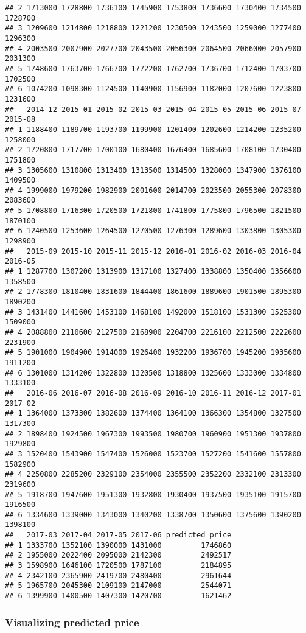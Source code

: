 \documentclass[
]{article}
\begin{document}
\begin{verbatim}
## 2 1713000 1728800 1736100 1745900 1753800 1736600 1730400 1734500 1728700
## 3 1209600 1214800 1218800 1221200 1230500 1243500 1259000 1277400 1296300
## 4 2003500 2007900 2027700 2043500 2056300 2064500 2066000 2057900 2031300
## 5 1748600 1763700 1766700 1772200 1762700 1736700 1712400 1703700 1702500
## 6 1074200 1098300 1124500 1140900 1156900 1182000 1207600 1223800 1231600
##   2014-12 2015-01 2015-02 2015-03 2015-04 2015-05 2015-06 2015-07 2015-08
## 1 1188400 1189700 1193700 1199900 1201400 1202600 1214200 1235200 1258000
## 2 1720800 1717700 1700100 1680400 1676400 1685600 1708100 1730400 1751800
## 3 1305600 1310800 1313400 1313500 1314500 1328000 1347900 1376100 1409500
## 4 1999000 1979200 1982900 2001600 2014700 2023500 2055300 2078300 2083600
## 5 1708800 1716300 1720500 1721800 1741800 1775800 1796500 1821500 1870100
## 6 1240500 1253600 1264500 1270500 1276300 1289600 1303800 1305300 1298900
##   2015-09 2015-10 2015-11 2015-12 2016-01 2016-02 2016-03 2016-04 2016-05
## 1 1287700 1307200 1313900 1317100 1327400 1338800 1350400 1356600 1358500
## 2 1778300 1810400 1831600 1844400 1861600 1889600 1901500 1895300 1890200
## 3 1431400 1441600 1453100 1468100 1492000 1518100 1531300 1525300 1509000
## 4 2088800 2110600 2127500 2168900 2204700 2216100 2212500 2222600 2231900
## 5 1901000 1904900 1914000 1926400 1932200 1936700 1945200 1935600 1911200
## 6 1301000 1314200 1322800 1320500 1318800 1325600 1333000 1334800 1333100
##   2016-06 2016-07 2016-08 2016-09 2016-10 2016-11 2016-12 2017-01 2017-02
## 1 1364000 1373300 1382600 1374400 1364100 1366300 1354800 1327500 1317300
## 2 1898400 1924500 1967300 1993500 1980700 1960900 1951300 1937800 1929800
## 3 1520400 1543900 1547400 1526000 1523700 1527200 1541600 1557800 1582900
## 4 2250800 2285200 2329100 2354000 2355500 2352200 2332100 2313300 2319600
## 5 1918700 1947600 1951300 1932800 1930400 1937500 1935100 1915700 1916500
## 6 1334600 1339000 1343000 1340200 1338700 1350600 1375600 1390200 1398100
##   2017-03 2017-04 2017-05 2017-06 predicted_price
## 1 1333700 1352100 1390000 1431000         1746860
## 2 1955000 2022400 2095000 2142300         2492517
## 3 1598900 1646100 1720500 1787100         2184895
## 4 2342100 2365900 2419700 2480400         2961644
## 5 1965700 2045300 2109100 2147000         2544071
## 6 1399900 1400500 1407300 1420700         1621462
\end{verbatim}

\hypertarget{visualizing-predicted-price}{%
\subsubsection{Visualizing predicted
price}\label{visualizing-predicted-price}}
\end{document}
